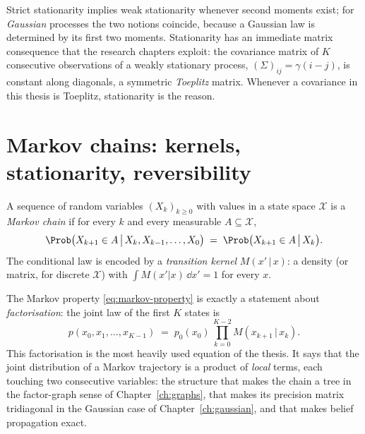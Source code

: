 Strict stationarity implies weak stationarity whenever second moments
exist; for \emph{Gaussian} processes the two notions coincide, because a
Gaussian law is determined by its first two moments. Stationarity has an
immediate matrix consequence that the research chapters exploit: the
covariance matrix of $K$ consecutive observations of a weakly stationary
process, $(\Sigma)_{ij} = \gamma(i - j)$, is constant along diagonals, a
symmetric \emph{Toeplitz} matrix. Whenever a covariance in this thesis is
Toeplitz, stationarity is the reason.

\section{Markov chains: kernels, stationarity, reversibility}
\label{sec:markov}

\begin{definition}
A sequence of random variables $(X_k)_{k \geq 0}$ with values in a state
space $\mathcal{X}$ is a \emph{Markov chain} if for every $k$ and every
measurable $A \subseteq \mathcal{X}$,
\begin{equation}
  \Prob\big(X_{k+1} \in A \,\big|\, X_k, X_{k-1}, \dots, X_0\big)
  \;=\; \Prob\big(X_{k+1} \in A \,\big|\, X_k\big) .
  \label{eq:markov-property}
\end{equation}
The conditional law is encoded by a \emph{transition kernel}
$M(x' \,|\, x)$: a density (or matrix, for discrete $\mathcal{X}$) with
$\int M(x'|x)\,\dd x' = 1$ for every $x$.
\end{definition}

The Markov property \eqref{eq:markov-property} is exactly a statement
about \emph{factorisation}: the joint law of the first $K$ states is
\begin{equation}
  p(x_0, x_1, \dots, x_{K-1})
  \;=\; p_0(x_0)\, \prod_{k=0}^{K-2} M(x_{k+1} \,|\, x_k) .
  \label{eq:chain-factorisation}
\end{equation}
This factorisation is the most heavily used equation of the thesis. It says that the joint distribution of a Markov trajectory is a
product of \emph{local} terms, each touching two consecutive variables:
the structure that makes the chain a tree in the factor-graph sense of
Chapter~\ref{ch:graphs}, that makes its precision matrix tridiagonal in
the Gaussian case of Chapter~\ref{ch:gaussian}, and that makes belief
propagation exact.

